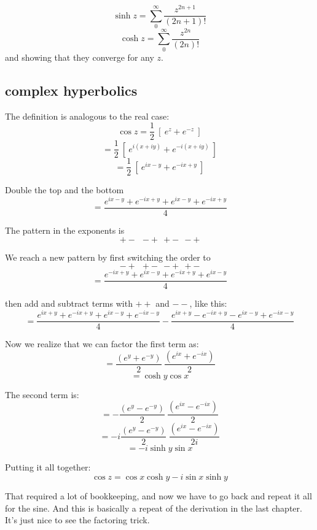 \documentclass[11pt, oneside]{article}
\begin{document}
\[ \sinh z = \sum_0^{\infty} \frac{z^{2n+1}}{(2n +1)!} \]
\[ \cosh z = \sum_0^{\infty} \frac{z^{2n}}{(2n)!} \]
and showing that they converge for any $z$.

\subsection*{complex hyperbolics}

The definition is analogous to the real case:
\[ \cos z = \frac{1}{2} \ [ \ e^{z} + e^{-z} \ ]  \]
\[ = \frac{1}{2} \ [ \ e^{i(x+iy)} + e^{-i(x + iy)} \ ]  \]
\[ = \frac{1}{2} \ [ \ e^{ix - y} + e^{-ix + y} \ ]  \]

Double the top and the bottom
\[ = \frac{e^{ix - y} + e^{-ix + y} + e^{ix - y} + e^{-ix + y}}{4}  \]

The pattern in the exponents is 
\[ +- \ \ -+ \ \ +- \ \ -+ \]

We reach a new pattern by first switching the order to 
\[ -+ \ \ +- \ \ -+ \ \ +- \]
\[ = \frac{e^{-ix + y} + e^{ix - y} + e^{-ix + y}  + e^{ix - y}}{4} \]

then add and subtract terms with $++$ and $--$, like this:
\[ = \frac{e^{ix + y} + e^{-ix + y} + e^{ix - y} + e^{-ix - y}}{4} - \frac{e^{ix + y} - e^{-ix + y}  - e^{ix - y} + e^{-ix - y}}{4}  \]

Now we realize that we can factor the first term as:
\[ = \frac{(e^y + e^{-y})}{2} \ \frac{(e^{ix} + e^{-ix})}{2}  \]
\[ = \cosh y \cos x \]

The second term is:
\[ = - \frac{(e^y - e^{-y})}{2} \ \frac{(e^{ix} - e^{-ix})}{2}  \]
\[ = -i \frac{(e^y - e^{-y})}{2} \ \frac{(e^{ix} - e^{-ix})}{2i}  \]
\[ = -i \sinh y \sin x \]

Putting it all together:
\[ \cos z = \cos x \cosh y - i \sin x \sinh y \]

That required a lot of bookkeeping, and now we have to go back and repeat it all for the sine.  And this is basically a repeat of the derivation in the last chapter.  It's just nice to see the factoring trick.
\end{document}
